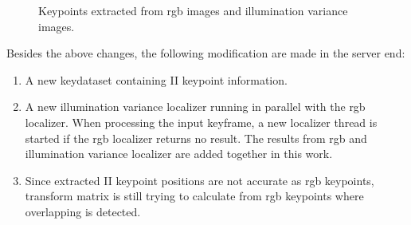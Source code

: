 \begin{figure}
	\centering
	\caption{Keypoints extracted from rgb images and illumination variance images.}
	\label{fig:keypoints}
\end{figure}

Besides the above changes, the following modification are made in the server end:

\begin{enumerate}
	\item A new keydataset containing II keypoint information. 
	\item A new illumination variance localizer running in parallel with the rgb localizer. When processing the input keyframe, a new localizer thread is started if the rgb localizer returns no result. The results from rgb and illumination variance localizer are added together in this work.
	\item Since extracted II keypoint positions are not accurate as rgb keypoints, transform matrix is still trying to calculate from rgb keypoints where overlapping is detected.
\end{enumerate}





\newpage
